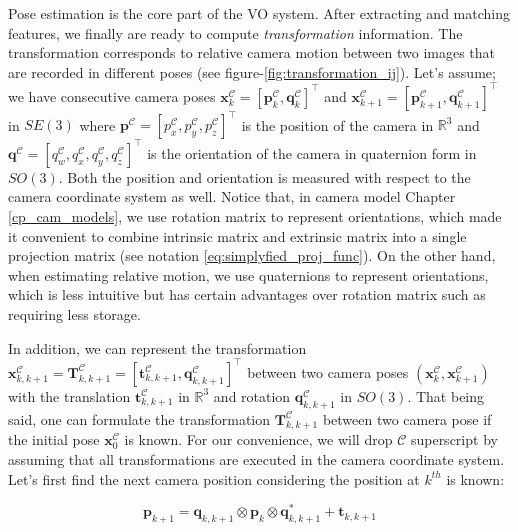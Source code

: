 \documentclass[12pt]{report}
\numberwithin{figure}{section}
\newcommand{\R}{\mathbb{R}}
\begin{document}
Pose estimation is the core part of the VO system. After extracting and 
matching features, we finally are ready to compute \textit{transformation} 
information. The transformation corresponds to relative camera motion between 
two images that are recorded in different poses (see 
figure-\ref{fig:transformation_ij}). Let's assume; we have consecutive camera 
poses $\mathbf{x}_{k}^{\mathcal{C}} = [\mathbf{p}_k^{\mathcal{C}}, 
\mathbf{q}_k^{\mathcal{C}}]^\top$ and 
$\mathbf{x}_{k+1}^{\mathcal{C}} = 
[\mathbf{p}_{k+1}^{\mathcal{C}}, \mathbf{q}_{k+1}^{\mathcal{C}}]^\top$ in 
$SE(3)$ 
where 
$\mathbf{p}^{\mathcal{C}} = [p_x^{\mathcal{C}}, 
p_y^{\mathcal{C}}, p_z^{\mathcal{C}}]^\top$ 
is the position of the camera in $\R^3$ and 
$\mathbf{q}^{\mathcal{C}} = [q_w^{\mathcal{C}}, q_x^{\mathcal{C}}, 
q_y^{\mathcal{C}}, 
q_z^{\mathcal{C}}]^\top$ is the orientation of the camera in quaternion 
form in 
$SO(3)$. Both the position and orientation is measured with respect to the 
camera coordinate system as well.  
Notice that, in camera model Chapter \ref{cp_cam_models}, we use rotation 
matrix to represent orientations, which made it convenient to combine 
intrinsic matrix and extrinsic matrix into a single projection matrix (see 
notation \eqref{eq:simplyfied_proj_func}). On the other hand, when estimating 
relative motion, we use 
quaternions to represent orientations, which is less intuitive but has 
certain advantages over rotation matrix such as requiring less storage.  

In addition, we can represent the transformation 
$\mathbf{x}_{k,k+1}^{\mathcal{C}} 
= 
\mathbf{T}_{k,k+1}^{\mathcal{C}}= 
[\mathbf{t}_{k,k+1}^{\mathcal{C}},\mathbf{q}_{k,k+1}^{\mathcal{C}}]^\top$ 
between 
two camera poses 
$(\mathbf{x}_k^{\mathcal{C}},\mathbf{x}_{k+1}^{\mathcal{C}})$ with the 
translation $\mathbf{t}_{k,k+1}^{\mathcal{C}}$ in $\R^3$ and  
rotation $\mathbf{q}_{k,k+1}^{\mathcal{C}}$ in $SO(3)$. 
That being said, 
one can formulate the transformation $\mathbf{T}_{k,k+1}^{\mathcal{C}}$ 
between two camera 
pose if the initial pose $\mathbf{x}_{0}^{\mathcal{C}}$ is known. 
For our convenience, we will drop $\mathcal{C}$ superscript by assuming that 
all transformations are executed in the camera coordinate system. 
Let's first find the next camera position considering the position at $k^{th}$ 
is known:

\begin{equation}\label{eq:translation_cam}
  \mathbf{p}_{k+1} = 
\mathbf{q}_{k,k+1} \otimes \mathbf{p}_k \otimes \mathbf{q}_{k,k+1}^* + 
  \mathbf{t}_{k,k+1}
\end{equation}
\end{document}
